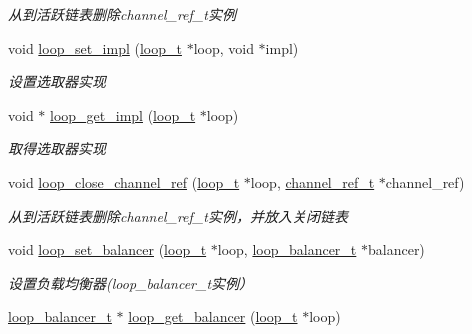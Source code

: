 \begin{DoxyCompactItemize}
\begin{DoxyCompactList}\small\item\em 从到活跃链表删除channel\+\_\+ref\+\_\+t实例 \end{DoxyCompactList}\item 
void \hyperlink{a00068_aa9654f1b872059f74665506fd67c9bc5_aa9654f1b872059f74665506fd67c9bc5}{loop\+\_\+set\+\_\+impl} (\hyperlink{a00050_a9c3ad1cd2de83e09f3a7b59fa82c94ee_a9c3ad1cd2de83e09f3a7b59fa82c94ee}{loop\+\_\+t} $\ast$loop, void $\ast$impl)
\begin{DoxyCompactList}\small\item\em 设置选取器实现 \end{DoxyCompactList}\item 
void $\ast$ \hyperlink{a00068_a0f78295541723911955dd41b71ceece1_a0f78295541723911955dd41b71ceece1}{loop\+\_\+get\+\_\+impl} (\hyperlink{a00050_a9c3ad1cd2de83e09f3a7b59fa82c94ee_a9c3ad1cd2de83e09f3a7b59fa82c94ee}{loop\+\_\+t} $\ast$loop)
\begin{DoxyCompactList}\small\item\em 取得选取器实现 \end{DoxyCompactList}\item 
void \hyperlink{a00068_a9328cf8ba2faccbf363b41e524631b75_a9328cf8ba2faccbf363b41e524631b75}{loop\+\_\+close\+\_\+channel\+\_\+ref} (\hyperlink{a00050_a9c3ad1cd2de83e09f3a7b59fa82c94ee_a9c3ad1cd2de83e09f3a7b59fa82c94ee}{loop\+\_\+t} $\ast$loop, \hyperlink{a00050_a151271c9d188ef28d4d24bb81dcc1263_a151271c9d188ef28d4d24bb81dcc1263}{channel\+\_\+ref\+\_\+t} $\ast$channel\+\_\+ref)
\begin{DoxyCompactList}\small\item\em 从到活跃链表删除channel\+\_\+ref\+\_\+t实例，并放入关闭链表 \end{DoxyCompactList}\item 
void \hyperlink{a00068_abedbb538c1cc8ef805dbfc0f58d80f9e_abedbb538c1cc8ef805dbfc0f58d80f9e}{loop\+\_\+set\+\_\+balancer} (\hyperlink{a00050_a9c3ad1cd2de83e09f3a7b59fa82c94ee_a9c3ad1cd2de83e09f3a7b59fa82c94ee}{loop\+\_\+t} $\ast$loop, \hyperlink{a00050_a649c7e850ab247b5f70ad27e335a129d_a649c7e850ab247b5f70ad27e335a129d}{loop\+\_\+balancer\+\_\+t} $\ast$balancer)
\begin{DoxyCompactList}\small\item\em 设置负载均衡器(loop\+\_\+balancer\+\_\+t实例） \end{DoxyCompactList}\item 
\hyperlink{a00050_a649c7e850ab247b5f70ad27e335a129d_a649c7e850ab247b5f70ad27e335a129d}{loop\+\_\+balancer\+\_\+t} $\ast$ \hyperlink{a00068_a1f9df6866c80e91a620320298d199315_a1f9df6866c80e91a620320298d199315}{loop\+\_\+get\+\_\+balancer} (\hyperlink{a00050_a9c3ad1cd2de83e09f3a7b59fa82c94ee_a9c3ad1cd2de83e09f3a7b59fa82c94ee}{loop\+\_\+t} $\ast$loop)

\end{DoxyCompactItemize}
